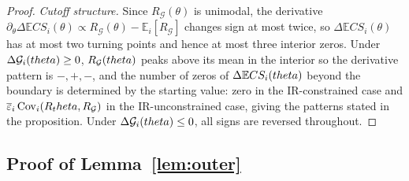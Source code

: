 \documentclass[master.tex]{subfiles}
\begin{document}
\begin{proof}
\noindent\textit{Cutoff structure.} Since $R_{\mathcal{G}}(\theta)$ is unimodal, the derivative $\partial_\theta\Delta\mathbb{E}CS_i(\theta)\propto R_{\mathcal{G}}(\theta)-\mathbb{E}_i[R_{\mathcal{G}}]$ changes sign at most twice, so $\Delta\mathbb{E}CS_i(\theta)$ has at most two turning points and hence at most three interior zeros. Under $\Delta\mathcal{G}_i(theta)\ge 0$, $R_{\mathcal{G}}(theta)$ peaks above its mean in the interior so the derivative pattern is $-,+,-$, and the number of zeros of $\Delta \mathbb{E} CS_i(theta)$ beyond the boundary is determined by the starting value: zero in the IR-constrained case and $\overline\varepsilon_i\,\mathrm{Cov}_{i}(R_theta,R_{\mathcal{G}})$ in the IR-unconstrained case, giving the patterns stated in the proposition. Under $\Delta\mathcal{G}_i(theta)\le 0$, all signs are reversed throughout.
\end{proof}


\subsection{Proof of Lemma~\ref{lem:outer}}
\end{document}
